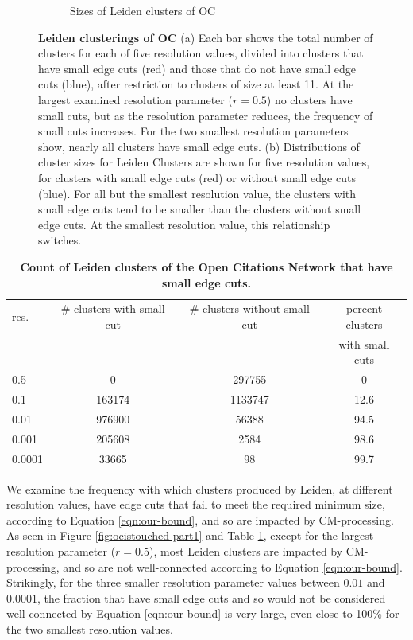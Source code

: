 \documentclass[11pt]{article}   	%
\begin{document}
\begin{figure}[H]
\begin{subfigure}[t]{0.45\textwidth}
\begin{center}
\caption{Sizes of Leiden clusters of OC}
\end{center}
\label{fig:ocistouched-part2}
\end{subfigure}
\caption{\textbf {Leiden clusterings of OC} (a) 
Each bar shows the total number of clusters for each of five resolution values, divided into clusters that have small edge cuts (red)  and those that do not have small edge cuts (blue), after restriction  to clusters of size at least 11. At the largest examined resolution parameter ($r=0.5$) no clusters have small cuts, but  as the resolution parameter reduces, the frequency of  small cuts increases.
For the two smallest resolution parameters show, nearly all clusters have small edge cuts.
(b)  Distributions of cluster sizes  for Leiden Clusters are shown for five resolution values, for clusters with small edge cuts (red) or without small edge cuts (blue). For all but the smallest resolution value, the clusters with small edge cuts tend to be smaller than the clusters without small edge cuts. At the smallest resolution value, this relationship switches.}
\end{figure}



\begin{table}[ht]
\centering
\begin{tabular}{lccc}
  \hline
 res. & \# clusters with small cut & \# clusters without  small cut & percent clusters   \\
 & & & with small cuts \\
  \hline
  0.5 & 0 & 297755 & 0 \\ 
   0.1 & 163174 & 1133747 & 12.6  \\ 
    0.01 & 976900 & 56388 & 94.5\\ 
    0.001 & 205608 & 2584 & 98.6 \\ 
   0.0001 & 33665 &  98 & 99.7 \\ 
   \hline
\end{tabular}
\caption{\textbf{Count of Leiden clusters of the Open Citations Network that have small edge cuts.}}     
\label{tab:ocistouched-part1}
\end{table}


We examine the frequency with which clusters produced by Leiden, at different resolution values, have edge cuts that fail to meet the required minimum size, according to Equation \ref{eqn:our-bound}, and so are  impacted by CM-processing. 
As seen in Figure \ref{fig:ocistouched-part1} and Table \ref{tab:ocistouched-part1}, except for the largest resolution parameter ($r=0.5$), most Leiden clusters are impacted by CM-processing, and so are not well-connected according to Equation \ref{eqn:our-bound}.
Strikingly, for the three smaller resolution parameter values between $0.01$ and $0.0001$, the fraction that have small edge cuts and so would not be considered well-connected by Equation \ref{eqn:our-bound} is very large, even close to 100\% for the two smallest resolution values.
\end{document}
